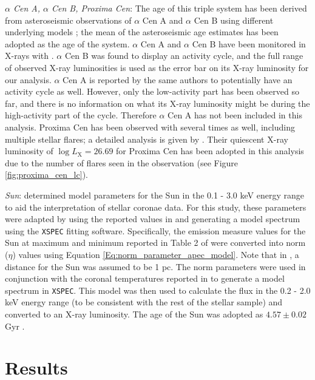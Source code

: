 \textit{$\alpha$ Cen A, $\alpha$ Cen B, Proxima Cen}: The age of this triple system has been derived from asteroseismic observations of $\alpha$ Cen A and $\alpha$ Cen B using different underlying models \citep{Miglio_Montalban_2005}; the mean of the asteroseismic age estimates has been adopted as the age of the system. $\alpha$ Cen A and $\alpha$ Cen B have been monitored in X-rays with \XMM \citep{Robrade_etal_2012}. $\alpha$ Cen B was found to display an activity cycle, and the full range of observed X-ray luminosities is used as the error bar on its X-ray luminosity for our analysis. $\alpha$ Cen A is reported by the same authors to potentially have an activity cycle as well. However, only the low-activity part has been observed so far, and there is no information on what its X-ray luminosity might be during the high-activity part of the cycle. Therefore $\alpha$ Cen A has not been included in this analysis. Proxima Cen has been observed with \XMM several times as well, including multiple stellar flares; a detailed analysis is given by \citet{Fuhrmeister_etal_2011}. Their quiescent X-ray luminosity of $\log L_{\mathrm{X}} = 26.69$ for Proxima Cen has been adopted in this analysis due to the number of flares seen in the observation (see Figure \ref{fig:proxima_cen_lc}).

\textit{Sun}: \citet{Peres_etal_2000} determined model parameters for the Sun in the 0.1 - 3.0 keV energy range to aid the interpretation of stellar coronae data. For this study, these parameters were adapted by using the reported values in \citet{Peres_etal_2000} and generating a model spectrum using the \texttt{XSPEC} fitting software. Specifically, the emission measure values for the Sun at maximum and minimum reported in Table 2 of \citet{Peres_etal_2000} were converted into norm ($\eta$) values using Equation \ref{Eq:norm_parameter_apec_model}. Note that in \citet{Peres_etal_2000}, a distance for the Sun was assumed to be 1 pc. The norm parameters were used in conjunction with the coronal temperatures reported in \citet{Peres_etal_2000} to generate a model spectrum in \texttt{XSPEC}. This model was then used to calculate the flux in the 0.2 - 2.0 keV energy range (to be consistent with the rest of the stellar sample) and converted to an X-ray luminosity. The age of the Sun was adopted as $4.57 \pm 0.02$ Gyr \citep{Bahcall_etal_1995}.

\section{Results}
